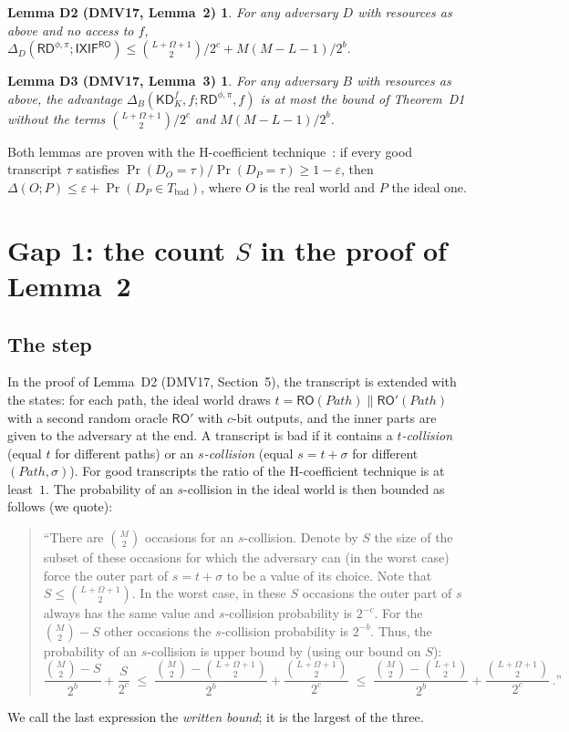 \documentclass[11pt,a4paper]{article}
\newtheorem*{lemDtwo}{Lemma D2 {\normalfont (DMV17, Lemma~2)}}
\newtheorem*{lemDthree}{Lemma D3 {\normalfont (DMV17, Lemma~3)}}
\theoremstyle{definition}
\theoremstyle{remark}
\newcommand{\KD}{\mathsf{KD}}
\newcommand{\RD}{\mathsf{RD}}
\newcommand{\IXIF}{\mathsf{IXIF}}
\newcommand{\RO}{\mathsf{RO}}
\newcommand{\Path}{\mathit{Path}}
\begin{document}
\begin{lemDtwo}
For any adversary $D$ with resources as above and no access to $f$,
$\Delta_D(\RD^{\phi,\pi} ; \IXIF^{\RO}) \le \binom{L+\Omega+1}{2}/2^c + M(M-L-1)/2^b$.
\end{lemDtwo}
\begin{lemDthree}
For any adversary $B$ with resources as above, the advantage $\Delta_B(\KD^f_K, f ; \RD^{\phi,\pi}, f)$ is at most the
bound of Theorem~D1 without the terms $\binom{L+\Omega+1}{2}/2^c$ and $M(M-L-1)/2^b$.
\end{lemDthree}
Both lemmas are proven with the H-coefficient technique~\cite{Pat08,CS14}: if every good transcript $\tau$ satisfies
$\Pr(D_O = \tau)/\Pr(D_P = \tau) \ge 1 - \varepsilon$, then $\Delta(O ; P) \le \varepsilon + \Pr(D_P \in T_{\mathrm{bad}})$,
where $O$ is the real world and $P$ the ideal one.

\section{Gap 1: the count \texorpdfstring{$S$}{S} in the proof of Lemma~2}\label{sec:gap1}

\subsection{The step}
In the proof of Lemma~D2 (DMV17, Section~5), the transcript is extended with the states: for each path, the ideal
world draws $t = \RO(\Path) \| \RO'(\Path)$ with a second random oracle $\RO'$ with $c$-bit outputs, and the inner parts
are given to the adversary at the end. A transcript is bad if it contains a \emph{$t$-collision} (equal $t$ for
different paths) or an \emph{$s$-collision} (equal $s = t + \sigma$ for different $(\Path, \sigma)$). For good transcripts the
ratio of the H-coefficient technique is at least~$1$. The probability of an $s$-collision in the ideal world is then
bounded as follows (we quote):
\begin{quote}\small
``There are $\binom{M}{2}$ occasions for an $s$-collision. Denote by $S$ the size of the subset of these occasions for
which the adversary can (in the worst case) force the outer part of $s = t + \sigma$ to be a value of its choice. Note that
$S \le \binom{L+\Omega+1}{2}$. In the worst case, in these $S$ occasions the outer part of $s$ always has the same value
and $s$-collision probability is $2^{-c}$. For the $\binom{M}{2} - S$ other occasions the $s$-collision probability is
$2^{-b}$. Thus, the probability of an $s$-collision is upper bound by (using our bound on $S$):
\[ \frac{\binom{M}{2} - S}{2^b} + \frac{S}{2^c} \;\le\; \frac{\binom{M}{2} - \binom{L+\Omega+1}{2}}{2^b} + \frac{\binom{L+\Omega+1}{2}}{2^c}
 \;\le\; \frac{\binom{M}{2} - \binom{L+1}{2}}{2^b} + \frac{\binom{L+\Omega+1}{2}}{2^c}\,\text{.''} \]
\end{quote}
We call the last expression the \emph{written bound}; it is the largest of the three.
\end{document}
